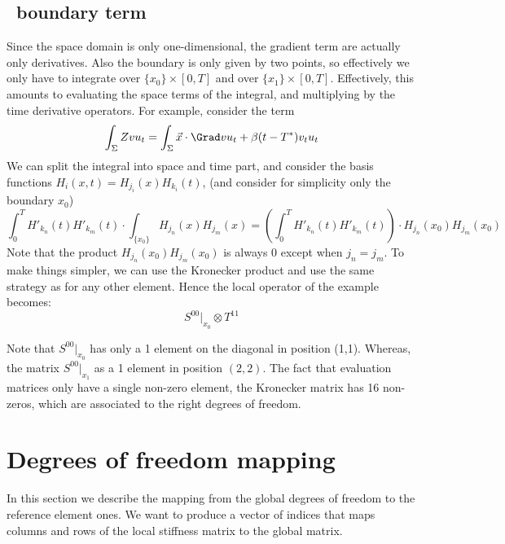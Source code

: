 \documentclass[]{report}
\begin{document}
    \subsection*{\Sigma\ boundary term}
    Since the space domain is only one-dimensional, the gradient term are actually only derivatives. Also the boundary is only given by two points, so effectively we only have to integrate over $\{x_0\}\times [0,T]$ and over $\{x_1\} \times [0,T]$. Effectively, this amounts to evaluating the space terms of the integral, and multiplying by the time derivative operators. For example, consider the term
    \begin{equation*}
        \int_{\Sigma} Zv u_t = \int_{\Sigma} \vec{x} \cdot \Grad v u_t + \beta(t-T^*) v_t u_t
    \end{equation*}
    We can split the integral into space and time part, and consider the basis functions $H_i(x,t) = H_{j_i}(x)H_{k_i}(t)$, (and consider for simplicity only the boundary $x_0$)
    \begin{equation*}
        \int_0^T H'_{k_n}(t)H'_{k_m}(t) \cdot \int_{\{x_0\}} H_{j_n}(x) H_{j_m}(x) = \left(\int_0^T H'_{k_n}(t)H'_{k_m}(t)\right) \cdot H_{j_n}(x_0)H_{j_m}(x_0)
    \end{equation*}
    Note that the product $ H_{j_n}(x_0) H_{j_m}(x_0)$ is always 0 except when $j_n = j_m$. To make things simpler, we can use the Kronecker product and use the same strategy as for any other element.
    Hence the local operator of the example becomes:
    \begin{equation*}
        S^{00}\Big|_{x_0} \otimes T^{11}
    \end{equation*}

    Note that $S^{00}\Big|_{x_0}$ has only a 1 element on the diagonal in position (1,1). Whereas, the matrix $S^{00}\Big|_{x_1}$ as a 1 element in position $(2,2)$. The fact that evaluation matrices only have a single non-zero element, the Kronecker matrix has 16 non-zeros, which are associated to the right degrees of freedom.

    \section*{Degrees of freedom mapping}
    In this section we describe the mapping from the global degrees of freedom to the reference element ones. We want to produce a vector of indices that maps columns and rows of the local stiffness matrix to the global matrix.
\end{document}
